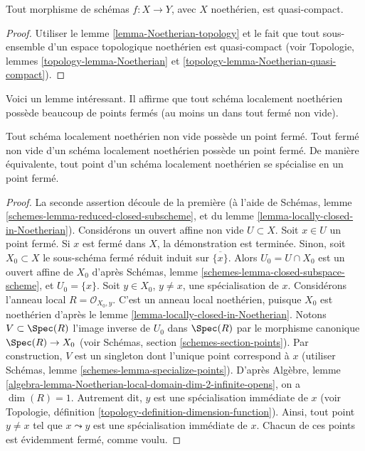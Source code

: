 \begin{lemma}
\label{lemma-morphism-Noetherian-schemes-quasi-compact}
Tout morphisme de schémas $f : X \to Y$, avec $X$ noethérien,
est quasi-compact.
\end{lemma}

\begin{proof}
Utiliser le lemme \ref{lemma-Noetherian-topology}
et le fait que tout sous-ensemble d'un espace topologique
noethérien est quasi-compact (voir Topologie,
lemmes \ref{topology-lemma-Noetherian} et
\ref{topology-lemma-Noetherian-quasi-compact}).
\end{proof}

\noindent
Voici un lemme
intéressant. Il affirme que tout schéma localement noethérien possède
beaucoup de points fermés (au moins un dans tout fermé non vide).

\begin{lemma}
\label{lemma-locally-Noetherian-closed-point}
Tout schéma localement noethérien non vide possède un point
fermé. Tout fermé non vide d'un schéma localement noethérien possède un point fermé. De
manière équivalente, tout point d'un schéma localement noethérien se
spécialise en un point fermé.
\end{lemma}

\begin{proof}
La seconde assertion découle de la première (à l'aide
de Schémas, lemme \ref{schemes-lemma-reduced-closed-subscheme},
et du lemme \ref{lemma-locally-closed-in-Noetherian}).
Considérons un ouvert affine non vide $U \subset X$.
Soit $x \in U$ un point fermé. Si $x$ est fermé
dans $X$, la démonstration est terminée. Sinon, soit $X_0 \subset X$ le
sous-schéma fermé réduit induit sur $\overline{\{x\}}$.
Alors $U_0 = U \cap X_0$ est un ouvert affine de $X_0$ d'après
Schémas, lemme \ref{schemes-lemma-closed-subspace-scheme}, et
$U_0 = \{x\}$. Soit $y \in X_0$, $y \not = x$, une spécialisation de $x$.
Considérons l'anneau local $R = \mathcal{O}_{X_0, y}$.
C'est un anneau local noethérien, puisque $X_0$ est noethérien
d'après le lemme \ref{lemma-locally-closed-in-Noetherian}. Notons $V \subset \Spec(R)$
l'image inverse de $U_0$ dans $\Spec(R)$ par le morphisme canonique
$\Spec(R) \to X_0$ (voir Schémas, section \ref{schemes-section-points}).
Par construction, $V$ est un singleton dont l'unique point correspond à $x$ (utiliser
Schémas, lemme \ref{schemes-lemma-specialize-points}).
D'après
Algèbre, lemme \ref{algebra-lemma-Noetherian-local-domain-dim-2-infinite-opens},
on a $\dim(R) = 1$.
Autrement dit, $y$ est une spécialisation immédiate
de $x$ (voir Topologie, définition \ref{topology-definition-dimension-function}).
Ainsi, tout
point $y \not = x$ tel que $x \leadsto y$ est une
spécialisation immédiate de $x$. Chacun de ces points est
évidemment fermé, comme voulu.
\end{proof}

